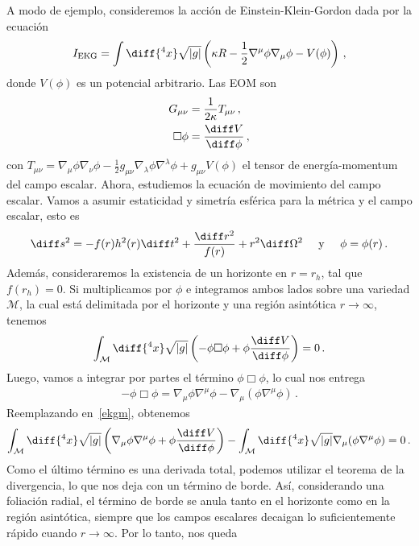 \documentclass[../Main.tex]{subfiles}
\begin{document}
A modo de ejemplo, consideremos la acción de Einstein-Klein-Gordon dada por la ecuación
\begin{align}
I_{\rm EKG}=\int\diff{^4x}\sqrt{|g|}\left(\kappa R - \frac{1}{2}\nabla^{\mu} \phi \nabla_{\mu} \phi - V(\phi)\right) \,,
\end{align}
donde $V(\phi)$ es un potencial arbitrario. Las EOM son  
\begin{align}
 G_{\mu\nu}&=\frac{1}{2\kappa} T_{\mu\nu}\, ,\\
   \Box\phi &= \frac{\diff V}{\diff\phi}\,,
\end{align}
con $T_{\mu\nu}=\nabla_{\mu}\phi\nabla_{\nu}\phi-\frac{1}{2}g_{\mu\nu}\nabla_{\lambda}\phi\nabla^{\lambda}\phi+g_{\mu\nu}V(\phi)$ el tensor de energía-momentum del campo escalar. Ahora, estudiemos la ecuación de movimiento del campo escalar. Vamos a asumir estaticidad y simetría esférica para la métrica y el campo escalar, esto es 
\begin{align}
\diff s^2=-f(r)h^2(r)\diff t^2+\frac{\diff r^2}{f(r)}+r^2\diff\Omega^2\;\;\;\;\;\mbox{y}\;\;\;\;\;\phi=\phi(r)\, .
\end{align}
Además, consideraremos la existencia de un horizonte en $r=r_h$, tal que $f(r_h)=0$. Si multiplicamos por $\phi$ e integramos ambos lados sobre una variedad $\mathcal{M}$, la cual está delimitada por el horizonte y una región asintótica $r\to\infty$, tenemos
\begin{align}
\int_{\mathcal{M}}\diff{^4x}\sqrt{|g|}\left(-\phi\Box\phi+\phi\frac{\diff V}{\diff\phi}\right)=0\, . \label{ekgm}
\end{align}
Luego, vamos a integrar por partes el término $\phi\Box\phi$, lo cual nos entrega
\begin{align}
-\phi\Box\phi=\nabla_{\mu}\phi\nabla^{\mu}\phi-\nabla_{\mu}(\phi\nabla^{\mu}\phi)\, .
\end{align}
Reemplazando en~\eqref{ekgm}, obtenemos
\begin{align}
\int_{\mathcal{M}}\diff{^4x}\sqrt{|g|}\left(\nabla_{\mu}\phi\nabla^{\mu}\phi+\phi\frac{\diff V}{\diff\phi}\right)-\int_{\mathcal{M}}\diff{^4x}\sqrt{|g|}\nabla_{\mu}(\phi\nabla^{\mu}\phi)=0\, .   
\end{align}
Como el último término es una derivada total, podemos utilizar el teorema de la divergencia, lo que nos deja con un término de borde. Así, considerando una foliación radial, el término de borde se anula tanto en el horizonte como en la región asintótica, siempre que los campos escalares decaigan lo suficientemente rápido cuando $r\to\infty$. Por lo tanto, nos queda
\end{document}
